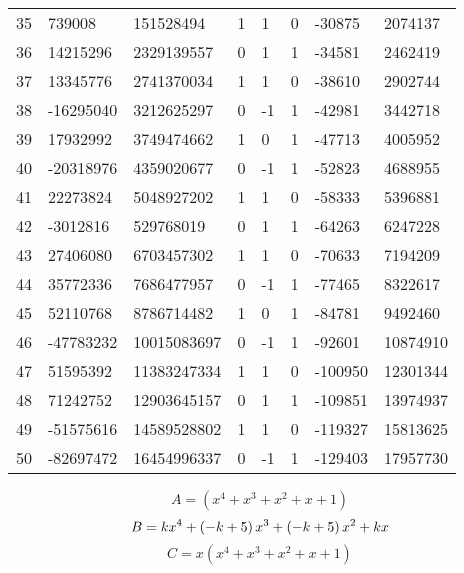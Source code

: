 \documentclass{amsart}
\begin{document}
\begin{longtable}{|l|l|l|lllll|}
35&739008&151528494&1&1&0&-30875&2074137\\
36&14215296&2329139557&0&1&1&-34581&2462419\\
37&13345776&2741370034&1&1&0&-38610&2902744\\
38&-16295040&3212625297&0&-1&1&-42981&3442718\\
39&17932992&3749474662&1&0&1&-47713&4005952\\
40&-20318976&4359020677&0&-1&1&-52823&4688955\\
41&22273824&5048927202&1&1&0&-58333&5396881\\
42&-3012816&529768019&0&1&1&-64263&6247228\\
43&27406080&6703457302&1&1&0&-70633&7194209\\
44&35772336&7686477957&0&-1&1&-77465&8322617\\
45&52110768&8786714482&1&0&1&-84781&9492460\\
46&-47783232&10015083697&0&-1&1&-92601&10874910\\
47&51595392&11383247334&1&1&0&-100950&12301344\\
48&71242752&12903645157&0&1&1&-109851&13974937\\
49&-51575616&14589528802&1&1&0&-119327&15813625\\
50&-82697472&16454996337&0&-1&1&-129403&17957730\\
\hline
\end{longtable}
$$A=(x^4
 + x^3
 + x^2
 + x
 + 1)$$
$$B=k\*x^4
 + \left(-k
 + 5\right) \*x^3
 + \left(-k
 + 5\right) \*x^2
 + k\*x$$
$$C=x(x^4
 + x^3
 + x^2
 + x
 + 1)$$
\end{document}

